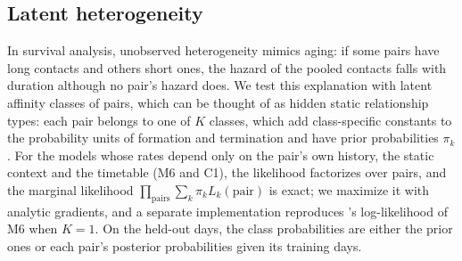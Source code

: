 \subsection{Latent heterogeneity}
In survival analysis, unobserved heterogeneity mimics aging: if some pairs have long contacts and others short ones, the hazard of the pooled contacts falls with duration although no pair's hazard does.
We test this explanation with latent affinity classes of pairs, which can be thought of as hidden static relationship types: each pair belongs to one of $K$ classes, which add class-specific constants to the probability units of formation and termination and have prior probabilities $\pi_k$.
For the models whose rates depend only on the pair's own history, the static context and the timetable (M6 and C1), the likelihood factorizes over pairs, and the marginal likelihood $\prod_{\text{pairs}} \sum_k \pi_k L_k(\text{pair})$ is exact; we maximize it with analytic gradients, and a separate implementation reproduces \tricl's log-likelihood of M6 when $K = 1$.
On the held-out days, the class probabilities are either the prior ones or each pair's posterior probabilities given its training days.

